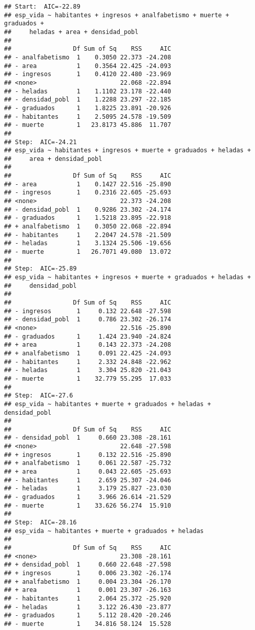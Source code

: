 \documentclass[]{article}
\begin{document}
\begin{verbatim}
## Start:  AIC=-22.89
## esp_vida ~ habitantes + ingresos + analfabetismo + muerte + graduados + 
##     heladas + area + densidad_pobl
## 
##                 Df Sum of Sq    RSS     AIC
## - analfabetismo  1    0.3050 22.373 -24.208
## - area           1    0.3564 22.425 -24.093
## - ingresos       1    0.4120 22.480 -23.969
## <none>                       22.068 -22.894
## - heladas        1    1.1102 23.178 -22.440
## - densidad_pobl  1    1.2288 23.297 -22.185
## - graduados      1    1.8225 23.891 -20.926
## - habitantes     1    2.5095 24.578 -19.509
## - muerte         1   23.8173 45.886  11.707
## 
## Step:  AIC=-24.21
## esp_vida ~ habitantes + ingresos + muerte + graduados + heladas + 
##     area + densidad_pobl
## 
##                 Df Sum of Sq    RSS     AIC
## - area           1    0.1427 22.516 -25.890
## - ingresos       1    0.2316 22.605 -25.693
## <none>                       22.373 -24.208
## - densidad_pobl  1    0.9286 23.302 -24.174
## - graduados      1    1.5218 23.895 -22.918
## + analfabetismo  1    0.3050 22.068 -22.894
## - habitantes     1    2.2047 24.578 -21.509
## - heladas        1    3.1324 25.506 -19.656
## - muerte         1   26.7071 49.080  13.072
## 
## Step:  AIC=-25.89
## esp_vida ~ habitantes + ingresos + muerte + graduados + heladas + 
##     densidad_pobl
## 
##                 Df Sum of Sq    RSS     AIC
## - ingresos       1     0.132 22.648 -27.598
## - densidad_pobl  1     0.786 23.302 -26.174
## <none>                       22.516 -25.890
## - graduados      1     1.424 23.940 -24.824
## + area           1     0.143 22.373 -24.208
## + analfabetismo  1     0.091 22.425 -24.093
## - habitantes     1     2.332 24.848 -22.962
## - heladas        1     3.304 25.820 -21.043
## - muerte         1    32.779 55.295  17.033
## 
## Step:  AIC=-27.6
## esp_vida ~ habitantes + muerte + graduados + heladas + densidad_pobl
## 
##                 Df Sum of Sq    RSS     AIC
## - densidad_pobl  1     0.660 23.308 -28.161
## <none>                       22.648 -27.598
## + ingresos       1     0.132 22.516 -25.890
## + analfabetismo  1     0.061 22.587 -25.732
## + area           1     0.043 22.605 -25.693
## - habitantes     1     2.659 25.307 -24.046
## - heladas        1     3.179 25.827 -23.030
## - graduados      1     3.966 26.614 -21.529
## - muerte         1    33.626 56.274  15.910
## 
## Step:  AIC=-28.16
## esp_vida ~ habitantes + muerte + graduados + heladas
## 
##                 Df Sum of Sq    RSS     AIC
## <none>                       23.308 -28.161
## + densidad_pobl  1     0.660 22.648 -27.598
## + ingresos       1     0.006 23.302 -26.174
## + analfabetismo  1     0.004 23.304 -26.170
## + area           1     0.001 23.307 -26.163
## - habitantes     1     2.064 25.372 -25.920
## - heladas        1     3.122 26.430 -23.877
## - graduados      1     5.112 28.420 -20.246
## - muerte         1    34.816 58.124  15.528
\end{verbatim}
\end{document}
